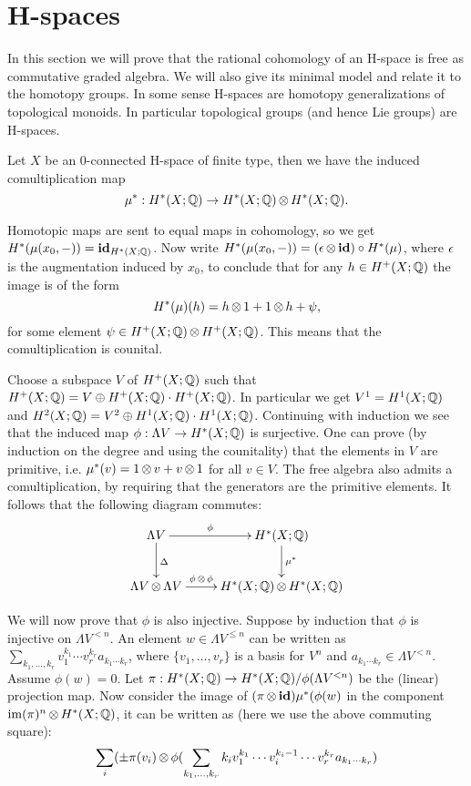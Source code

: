 \section{H-spaces}
In this section we will prove that the rational cohomology of an H-space is free as commutative graded algebra. We will also give its minimal model and relate it to the homotopy groups. In some sense H-spaces are homotopy generalizations of topological monoids. In particular topological groups (and hence Lie groups) are H-spaces.


Let $X$ be an $0$-connected H-space of finite type, then we have the induced comultiplication map 
$$\mu^\ast: H^\ast(X; \mathbb{Q}) \to H^\ast(X; \mathbb{Q}) \operatorname*{\otimes} H^\ast(X; \mathbb{Q}).$$

Homotopic maps are sent to equal maps in cohomology, so we get $H^\ast(\mu(x_0, -)) = \mathbf{id}_{H^\ast(X; \mathbb{Q})}$. Now write $H^\ast(\mu(x_0, -)) = (\epsilon \operatorname*{\otimes} \mathbf{id}) \circ H^\ast(\mu)$, where $\epsilon$ is the augmentation induced by $x_0$, to conclude that for any $h \in H^{+}(X; \mathbb{Q})$ the image is of the form
$$ H^\ast(\mu)(h) = h \operatorname*{\otimes} 1 + 1 \operatorname*{\otimes} h + \psi, $$
for some element $\psi \in H^{+}(X; \mathbb{Q}) \operatorname*{\otimes} H^{+}(X; \mathbb{Q})$. This means that the comultiplication is counital.

Choose a subspace $V$ of $H^+(X; \mathbb{Q})$ such that $H^+(X; \mathbb{Q}) = V \oplus H^+(X; \mathbb{Q}) \cdot H^+(X; \mathbb{Q})$. In particular we get $V^1 = H^1(X; \mathbb{Q})$ and $H^2(X; \mathbb{Q}) = V^2 \oplus H^1(X; \mathbb{Q}) \cdot H^1(X; \mathbb{Q})$. Continuing with induction we see that the induced map $\phi : \Lambda V \to H^\ast(X; \mathbb{Q})$ is surjective. One can prove (by induction on the degree and using the counitality) that the elements in $V$ are primitive, i.e. $\mu^\ast(v) = 1 \operatorname*{\otimes} v + v \operatorname*{\otimes} 1$ for all $v \in V$. The free algebra also admits a comultiplication, by requiring that the generators are the primitive elements. It follows that the following diagram commutes:
\[ \xymatrix{
	\Lambda V \ar[r]^-\phi \ar[d]^\Delta & H^\ast(X; \Q) \ar[d]^{\mu^\ast} \\
	\Lambda V \tensor \Lambda V \ar[r]^-{\phi\tensor\phi} & H^\ast(X; \Q) \tensor H^\ast(X; \Q) \\
} \]

We will now prove that $\phi$ is also injective. Suppose by induction that $\phi$ is injective on $\Lambda V^{<n}$. An element $w \in \Lambda V^{\leq n}$ can be written as $\sum_{k_1, \ldots, k_r} v_1^{k_1} \cdots v_r^{k_r} a_{k_1 \cdots k_r}$, where $\{v_1, \ldots, v_r\}$ is a basis for $V^n$ and $a_{k_1 \cdots k_r} \in \Lambda V^{<n}$. Assume $\phi(w) = 0$. Let $\pi : H^\ast(X; \mathbb{Q}) \to H^\ast(X; \mathbb{Q}) / \phi(\Lambda V^{<n})$ be the (linear) projection map. Now consider the image of $(\pi \operatorname*{\otimes} \mathbf{id}) \mu^\ast (\phi(w)$ in the component $\operatorname*{im}(\pi)^n \operatorname*{\otimes} H^\ast(X; \mathbb{Q})$, it can be written as (here we use the above commuting square):
\[ \sum_i ( \pm \pi(v_i) \operatorname*{\otimes} \phi(\sum_{k_1, \ldots, k_r} k_i v_1^{k_1} \cdots v_i^{k_i - 1} \cdots v_r^{k_r}a_{k_1 \cdots k_r}) \]

